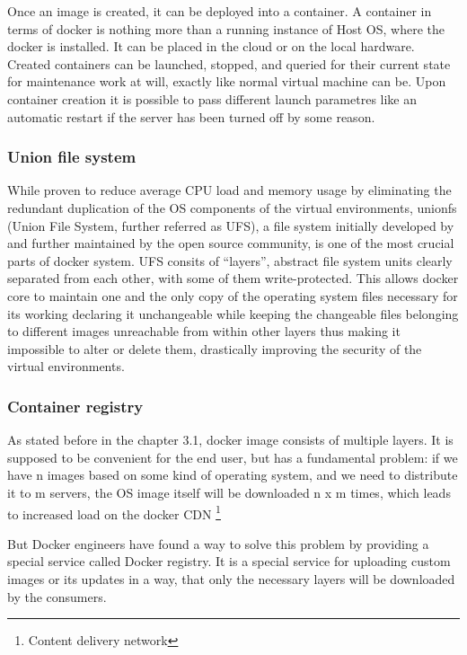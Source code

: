 Once an image is created, it can be deployed into a container. A
container in terms of docker is nothing more than a running
instance of Host OS, where the docker is installed. It can be placed
in the cloud or on the local hardware.
Created containers can be launched, stopped, and queried for their
current state for maintenance work at will, exactly like normal virtual
machine can be. Upon container creation it is possible to pass
different launch parametres like an automatic restart if the server
has been turned off by some reason.

\subsubsection{Union file system}

While proven to reduce average CPU load and memory usage by
eliminating the redundant duplication of the OS components of the
virtual environments,
unionfs (Union File System, further referred as UFS), a file system
initially developed by and further maintained by the open source
community, is one of the most crucial parts of docker system.
UFS consits of “layers”, abstract file system units clearly separated
from each other, with some of them write-protected. This allows
docker core to maintain one and the only copy of the operating
system files necessary for its working declaring it unchangeable
while keeping the changeable files belonging to different images
unreachable from within other layers thus making it impossible to
alter or delete them, drastically improving the security of the virtual
environments.

\subsubsection{Container registry}

As stated before in the chapter 3.1, docker image consists of multiple layers.
It is supposed to be convenient for the end user,
but has a fundamental problem: if we have
n images based on some kind of operating system, and we need
to distribute it to m servers, the OS image itself will be downloaded
n x m times, which leads to increased
load on the docker CDN \footnote{Content delivery network}

But Docker engineers have found a way to solve this problem by providing
a special service called Docker registry. It is a special service for uploading
custom images or its updates in a way, that only the necessary layers will be
downloaded by the consumers.

